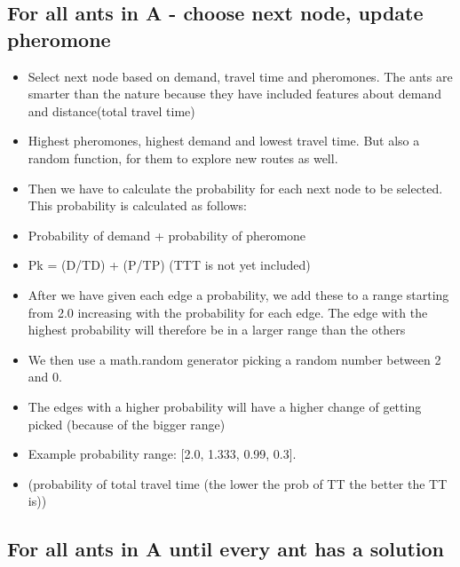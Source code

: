 \subsection{For all ants in A - choose next node, update pheromone }
\begin{itemize}
\item Select next node based on demand, travel time and pheromones. The ants are smarter than the nature because they have included features about demand and distance(total travel time)
\item Highest pheromones, highest demand and lowest travel time. But also a random function, for them to explore new routes as well.
\end{itemize}
\begin{itemize}
\item Then we have to calculate the probability for each next node to be selected. This probability is calculated as follows:
\item Probability of demand + probability of pheromone 
\item Pk = (D/TD) + (P/TP) (TTT is not yet included)
\item After we have given each edge a probability, we add these to a range starting from 2.0 increasing with the probability for each edge. The edge with the highest probability will therefore be in a larger range than the others
\item We then use a math.random generator picking a random number between 2 and 0. 
\item The edges with a higher probability will have a higher change of getting picked (because of the bigger range)
\item Example probability range: [2.0, 1.333, 0.99, 0.3]. 
\end{itemize}
\begin{itemize}
\item (probability of total travel time (the lower the prob of TT the better the TT is)) %
\end{itemize}



\subsection{For all ants in A until every ant has a solution}

